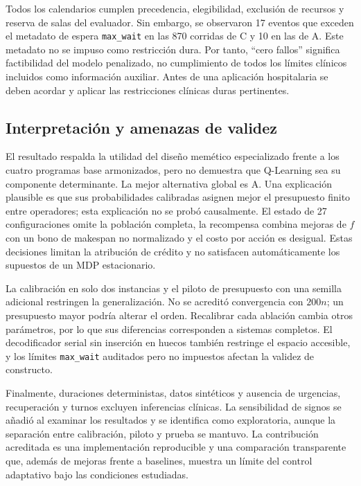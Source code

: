 \documentclass[11pt,a4paper]{article}
\begin{document}
Todos los calendarios cumplen precedencia, elegibilidad, exclusión de recursos y reserva de salas del evaluador. Sin embargo, se observaron 17 eventos que exceden el metadato de espera \texttt{max\_wait} en las 870 corridas de C y 10 en las de A. Este metadato no se impuso como restricción dura. Por tanto, ``cero fallos'' significa factibilidad del modelo penalizado, no cumplimiento de todos los límites clínicos incluidos como información auxiliar. Antes de una aplicación hospitalaria se deben acordar y aplicar las restricciones clínicas duras pertinentes.

\subsection{Interpretación y amenazas de validez}
El resultado respalda la utilidad del diseño memético especializado frente a los cuatro programas base armonizados, pero no demuestra que Q-Learning sea su componente determinante. La mejor alternativa global es A. Una explicación plausible es que sus probabilidades calibradas asignen mejor el presupuesto finito entre operadores; esta explicación no se probó causalmente. El estado de 27 configuraciones omite la población completa, la recompensa combina mejoras de $f$ con un bono de makespan no normalizado y el costo por acción es desigual. Estas decisiones limitan la atribución de crédito y no satisfacen automáticamente los supuestos de un MDP estacionario.

La calibración en solo dos instancias y el piloto de presupuesto con una semilla adicional restringen la generalización. No se acreditó convergencia con $200n$; un presupuesto mayor podría alterar el orden. Recalibrar cada ablación cambia otros parámetros, por lo que sus diferencias corresponden a sistemas completos. El decodificador serial sin inserción en huecos también restringe el espacio accesible, y los límites \texttt{max\_wait} auditados pero no impuestos afectan la validez de constructo.

Finalmente, duraciones deterministas, datos sintéticos y ausencia de urgencias, recuperación y turnos excluyen inferencias clínicas. La sensibilidad de signos se añadió al examinar los resultados y se identifica como exploratoria, aunque la separación entre calibración, piloto y prueba se mantuvo. La contribución acreditada es una implementación reproducible y una comparación transparente que, además de mejoras frente a baselines, muestra un límite del control adaptativo bajo las condiciones estudiadas.
\label{sec:resultados-fin}
\end{document}

